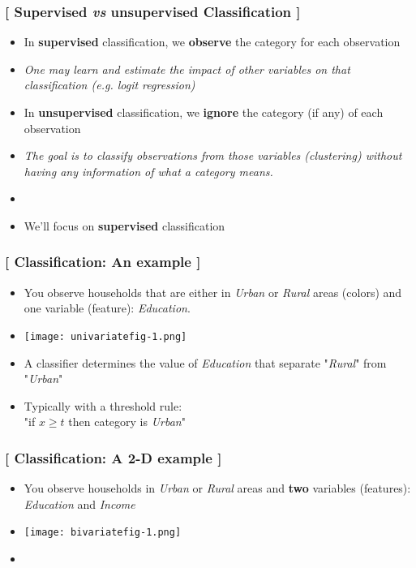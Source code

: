 \documentclass[xcolor=x11names,compress, handhouts]{beamer}
\renewcommand{\(}{\begin{columns}}
\renewcommand{\)}{\end{columns}}
\newcommand{\<}[1]{\begin{column}{#1}}
\renewcommand{\>}{\end{column}}
\begin{document}
\begin{frame} %
\frametitle{\textcolor{brique}{[ Supervised \textit{vs} unsupervised Classification ]}}
\pause
\begin{itemize}[<+->]
  \item In \textbf{supervised }classification, we \textbf{observe} the category for each observation
  \item[] \textit{One may learn  and estimate the impact of other variables on that classification (\textit{e.g}. logit regression)}
   \item In \textbf{unsupervised }classification, we \textbf{ignore} the category (if any) of each observation
  \item[]  \textit{The goal is to classify observations from those variables (clustering) without having any information of what a category means.}
  \item[]
  \item We'll focus on \textbf{supervised }classification
\end{itemize}
\end{frame}



\begin{frame} %
\frametitle{\textcolor{brique}{[ Classification:  An example ]}}
\pause
\begin{itemize}[<+->]
  \item You observe households that are either in \textit{Urban} or \textit{Rural} areas (colors) and one variable (feature): \textit{Education}.
  \item[] \begin{center}\texttt{[image: univariatefig-1.png]} \end{center}
  \item A classifier determines the value of\textit{ Education} that separate "\textit{Rural}" from  "\textit{Urban}"
  \item[] Typically  with a threshold rule:\\ \hspace{1cm} "if $x \geq t$  then  category is \textit{Urban}"
\end{itemize}
\end{frame}



\begin{frame} %
\frametitle{\textcolor{brique}{[ Classification:  A 2-D example ]}}
\pause
\begin{itemize}[<+->]
  \item You observe households in \textit{Urban} or \textit{Rural} areas and \textbf{two} variables (features): \textit{Education} and \textit{Income}
  \item[] \begin{center}\texttt{[image: bivariatefig-1.png]} \end{center}
  \item[]
\end{itemize}
\end{frame}
\end{document}
